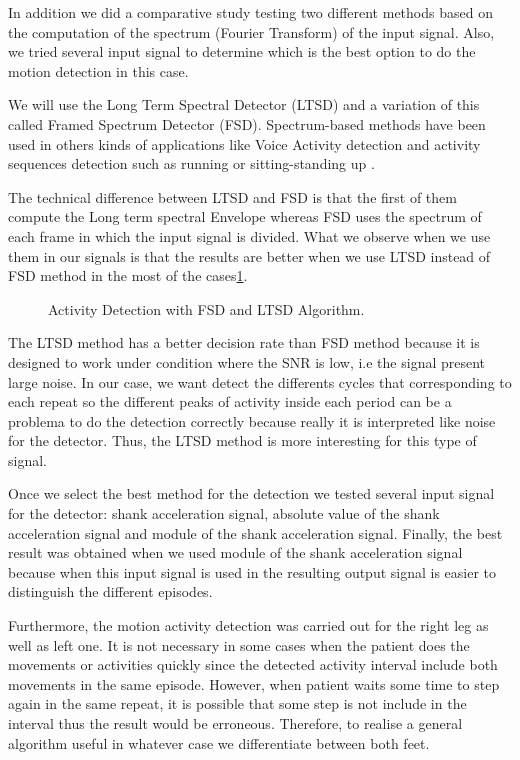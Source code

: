 In addition we did a comparative study testing two different methods based on the  computation of the spectrum (Fourier Transform) of the input signal. Also, we tried several input signal to determine which is the best option to do the motion detection in this case.

We will use the Long Term Spectral Detector (LTSD) \cite{Ramirez2004} and a variation of this called Framed Spectrum Detector (FSD). Spectrum-based methods have been used in others kinds of applications like Voice Activity detection \cite{Ramirez2006}\cite{Ramirez2007} and activity sequences detection such as running or sitting-standing up\cite{A.Olivares2013} .

The technical difference between LTSD and FSD is that the first of them compute the Long term spectral Envelope whereas FSD uses the spectrum of each frame  in which the input signal is divided\cite{A.Olivares2013}. What we observe when we use them in our signals is that the results are better when we use LTSD instead of FSD method  in the most of the cases\ref{fig:activityDetection}.

\begin{figure}[H]
	\centering
	\caption{Activity Detection with FSD and LTSD Algorithm.}
	\label{fig:activityDetection}
\end{figure} 

The LTSD method has a better decision rate than FSD method because it is designed to work under condition where the SNR is low, i.e the signal present large noise\cite{A.Olivares2013}. In our case, we want detect the differents cycles that corresponding to each repeat so the different peaks of activity inside each period can be a problema to do the detection correctly because really it is interpreted like noise for the detector. Thus, the LTSD method is more interesting for this type of signal.

Once we select the best method for the detection we tested several input signal for the detector: shank acceleration signal, absolute value of the shank acceleration signal and module of the shank acceleration signal. Finally, the best result was obtained when we used module of the shank acceleration signal because when this input signal is used in the resulting output signal is easier to distinguish the different episodes.

Furthermore, the motion activity detection was carried out for the right leg as well as left one. It is not necessary in some cases when the patient does the movements or activities quickly since the detected activity interval  include both movements in the same episode. However, when patient waits some time to step again in the same repeat, it is possible that some step is not  include in the interval thus the result would be erroneous. Therefore, to realise a general algorithm useful in whatever case we differentiate between both feet.


